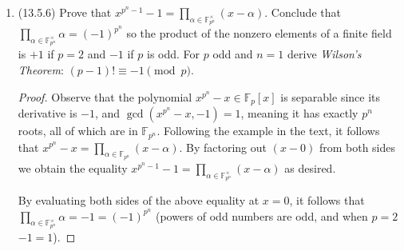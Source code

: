 \documentclass[11pt]{article}
\begin{document}
\begin{enumerate}
\begin{enumerate}
\begin{proof}
            Observe that the splitting field for $f(x)$ is contained in $K_1K_2$ since $K_1K_2$ contains all the roots for both $f_1(x)$ and $f_2(x)$ (since $K_1K_2$ is $F$ adjoined with every root of $f_1(x)$ and $f_2(x)$.), which enables $f_1(x)f_2(x)$ to split completely. The reverse inclusion comes from the fact that in order for $f(x)$ to split completely in a field, it must contain the roots of $f_1(x)$ and $f_2(x)$. So the splitting field contains both $K_1$ and $K_2$, and by minimality of the composite field, $K_1K_2$ is contained in the splitting field. Hence it is the splitting field for $f(x)$.
        \end{proof}
        \item Prove that $K_1\cap K_2$ is a splitting field over $F$. [Use the preceding exercise.] We show that every irreducible polynomial which has a root in $K_1\cap K_2$ splits completely. Let $f(x)\in F[x]$ be an irreducible polynomial with a root $\alpha$ in $K_1\cap K_2$. But because $\alpha$ is in a splitting field $K_1$ over $F$ and $f(x)$ is irreducible, it splits in $K_1[x]$ so that every root of $f(x)$ is contained in $K_1$. Similarly, every root of $f(x)$ is contained in $K_2$, so that every root of $f(x)$ is in $K_1\cap K_2$. It follows that $f(x)$ splits completely in $(K_1\cap K_2)[x]$, and since $f(x)$ was an arbitrary irreducible polynomial in $F[x]$, we have that $K_1\cap K_2$ is a splitting field over $F$.
    \end{enumerate}
    \item (13.5.6) Prove that $x^{p^n-1}-1 = \prod_{\alpha\in\mathbb{F}_{p^n}^\times}(x-\alpha)$. Conclude that $\prod_{\alpha\in\mathbb{F}_{p^n}^\times}\alpha = (-1)^{p^n}$ so the product of the nonzero elements of a finite field is $+1$ if $p = 2$ and $-1$ if $p$ is odd. For $p$ odd and $n = 1$ derive \textit{Wilson's Theorem}: $(p-1)!\equiv -1\pmod p$. \begin{proof}
        Observe that the polynomial $x^{p^n}-x\in \mathbb{F}_p[x]$ is separable since its derivative is $-1$, and $\gcd(x^{p^n}-x, -1) = 1$, meaning it has exactly $p^n$ roots, all of which are in $\mathbb{F}_{p^n}$. Following the example in the text, it follows that $x^{p^n}-x = \prod_{\alpha\in \mathbb{F}_{p^n}}(x-\alpha)$. By factoring out $(x-0)$ from both sides we obtain the equality $x^{p^n-1}-1 = \prod_{\alpha\in \mathbb{F}^\times_{p^n}}(x-\alpha)$ as desired.

        By evaluating both sides of the above equality at $x = 0$, it follows that $\prod_{\alpha\in \mathbb{F}^\times_{p^n}}\alpha = -1 = (-1)^{p^n}$ (powers of odd numbers are odd, and when $p = 2$ $-1 = 1$).


\end{proof}
\end{enumerate}
\end{document}
